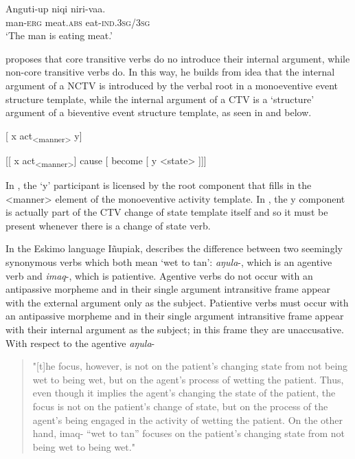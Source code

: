 \documentclass[output=paper,colorlinks,citecolor=brown,nonflat]{./langscibook}
\begin{document}
    \ex \label{ex:basilico:4b}
    \gll Anguti-up  niqi    niri-vaa.\\
    man{}-\textsc{{erg}}  meat.\textsc{{abs}}  eat{}-\textsc{{ind}}.3\textsc{sg}/3\textsc{sg}
    \\
    \glt `The man is eating meat.'
    \z
    \z


\citet{Basilico2017} proposes that core transitive verbs do no introduce their internal argument, while non-core transitive verbs do. In this way, he builds from  idea that the internal argument of a NCTV is introduced by the verbal root in a monoeventive event structure template, while the internal argument of a CTV is a ‘structure’ argument of a bieventive event structure template, as seen in  and  below.

\ea%
    \label{ex:basilico:5}
     {[} x act\textsubscript{<manner>} y{]}
    \z

\ea%
    \label{ex:basilico:6}
     {[}{[} x act\textsubscript{<manner>}{]} cause {[} become  {[} y <state> {]}{]}{]}
    \z

In , the ‘y’ participant is licensed by the root component that fills in the <manner> element of the monoeventive activity template. In , the y component is actually part of the CTV change of state template itself and so it must be present whenever there is a change of state verb.

In the Eskimo language Iñupiak, \citet{Nagai2006} describes the difference between two seemingly synonymous verbs which both mean ‘wet to tan’: \textit{aŋula}-, which is an agentive verb and \textit{imaq}{}-, which is patientive. Agentive verbs do not occur with an antipassive morpheme and in their single argument intransitive frame appear with the external argument only as the subject. Patientive verbs must occur with an antipassive morpheme and in their single argument intransitive frame appear with their internal argument as the subject; in this frame they are unaccusative. With respect to the agentive \textit{aŋula}{}-

\begin{quote}
"[t]he focus, however, is not on the patient’s changing state from not being wet to being wet, but on the agent’s process of wetting the patient. Thus, even though it implies the agent’s changing the state of the patient, the focus is not on the patient’s change of state, but on the process of the agent’s being engaged in the activity of wetting the patient. On the other hand, imaq- “wet to tan” focuses on the patient’s changing state from not being wet to being wet." \citep[??]{Nagai2006}
\end{quote}
\end{document}
